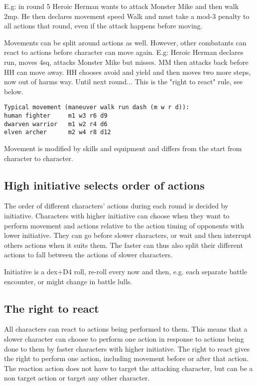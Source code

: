 E.g: in round 5 Heroic Herman wants to attack Monster Mike and then walk 2mp. He then declares movement speed Walk and must take a mod-3 penalty to all actions that round, even if the attack happens before moving.

Movements can be split around actions as well. However, other combatants can react to actions before character can move again. E.g: Heroic Herman declares run, moves 4sq, attacks Monster Mike but misses. MM then attacks back before HH can move away. HH chooses avoid and yield and then moves two more steps, now out of harms way. Until next round... This is the "right to react" rule, see below.

\begin{verbatim}
Typical movement (maneuver walk run dash (m w r d)):
human fighter     m1 w3 r6 d9
dwarven warrior   m1 w2 r4 d6
elven archer      m2 w4 r8 d12
\end{verbatim}

Movement is modified by skills and equipment and differs from the start from character to character.


\subsection*{High initiative selects order of actions}
The order of different characters' actions during each round is decided by initiative. Characters with higher initiative can choose when they want to perform movement and actions relative to the action timing of opponents with lower initiative. They can go before slower characters, or wait and then interrupt others actions when it suits them. The faster can thus also split their different actions to fall between the actions of slower characters.

Initiative is a dex+D4 roll, re-roll every now and then, e.g. each separate battle encounter, or might change in battle lulls.


\subsection*{The right to react}
All characters can react to actions being performed to them. This means that a slower character can choose to perform one action in response to actions being done to them by faster characters with higher initiative.
The right to react gives the right to perform one action, including movement before or after that action. The reaction action does not have to target the attacking character, but can be a non target action or target any other character.

